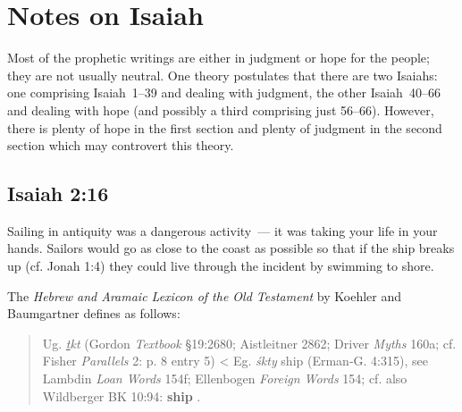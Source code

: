 \section{Notes on Isaiah}\label{app:isaiah}
Most of the prophetic writings are either in judgment or hope for the people; they are not usually neutral. One theory postulates that there are two Isaiahs: one comprising Isaiah~1--39 and dealing with judgment, the other Isaiah~40--66 and dealing with hope (and possibly a third comprising just 56--66). However, there is plenty of hope in the first section and plenty of judgment in the second section which may controvert this theory.

\subsection{Isaiah 2:16}\label{app:isa-2-16}
Sailing in antiquity was a dangerous activity~--- it was taking your life in your hands. Sailors would go as close to the coast as possible so that if the ship breaks up (cf. Jonah 1:4) they could live through the incident by swimming to shore.

The \textit{Hebrew and Aramaic Lexicon of the Old Testament} by Koehler and Baumgartner defines  as follows:
\begin{quote}
  Ug. \textit{\underline{t}kt} (Gordon \textit{Textbook} \S19:2680; Aistleitner 2862; Driver \textit{Myths} 160a; cf. Fisher \textit{Parallels} 2: p. 8 entry 5) < Eg. \textit{\'skty} ship (Erman-G. 4:315), see Lambdin \textit{Loan Words} 154f; Ellenbogen \textit{Foreign Words} 154; cf. also Wildberger BK 10:94: \textbf{ship} . \hadagger
\end{quote}


